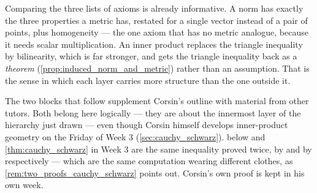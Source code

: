Comparing the three lists of axioms is already informative. A norm has exactly the three
properties a metric has, restated for a single vector instead of a pair of points, plus
homogeneity --- the one axiom that has no metric analogue, because it needs scalar
multiplication. An inner product replaces the triangle inequality by bilinearity, which is far
stronger, and gets the triangle inequality back as a \emph{theorem}
(\cref{prop:induced_norm_and_metric}) rather than an assumption. That is the sense in which each
layer carries more structure than the one outside it.

\begin{ainote}
The two blocks that follow supplement Corsin's outline with material from other tutors. Both
belong here logically --- they are about the innermost layer of the hierarchy just drawn --- even
though Corsin himself develops inner-product geometry on the Friday of Week 3
(\cref{sec:cauchy_schwarz}).  below and
\cref{thm:cauchy_schwarz} in Week 3 are the same inequality proved twice, by
 and by  respectively ---
which are the same computation wearing different clothes, as
\cref{rem:two_proofs_cauchy_schwarz} points out. Corsin's own proof is kept in his own week.
\end{ainote}

